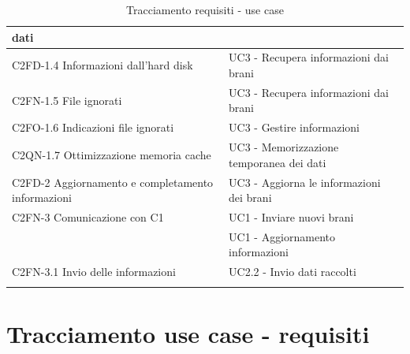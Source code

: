 \begin{footnotesize}
\begin{longtable}[!h]{|l|l|}
dati \\ \hline
C2FD-1.4 Informazioni dall'hard disk & UC3 - Recupera informazioni dai brani \\
\hline
C2FN-1.5 File ignorati & UC3 - Recupera informazioni dai brani\\ \hline
C2FO-1.6 Indicazioni file ignorati & UC3 - Gestire informazioni \\ \hline
C2QN-1.7 Ottimizzazione memoria cache & UC3 - Memorizzazione temporanea dei dati
\\ \hline
C2FD-2 Aggiornamento e completamento informazioni & UC3 - Aggiorna le
informazioni dei brani \\ \hline
C2FN-3 Comunicazione con C1 & UC1 - Inviare nuovi brani \\
 & UC1 - Aggiornamento informazioni \\ \hline
C2FN-3.1 Invio delle informazioni & UC2.2 - Invio dati raccolti \\ \hline
\caption{Tracciamento requisiti - use case}
\end{longtable}
\end{footnotesize}

\newpage
\section{Tracciamento use case - requisiti}

